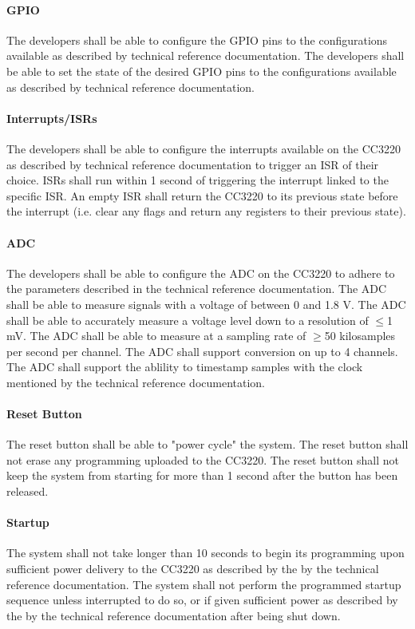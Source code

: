 \paragraph{GPIO} The developers shall be able to configure the GPIO pins to
the configurations available as described by technical reference documentation.
The developers shall be able to set the state of the desired GPIO pins to
the configurations available as described by technical reference documentation.

\paragraph{Interrupts/ISRs} The developers shall be able to configure
the interrupts available on the CC3220 as described by technical reference
documentation to trigger an ISR of their choice. ISRs shall run within 1 second
of triggering the interrupt linked to the specific ISR. An empty ISR shall
return the CC3220 to its previous state before the interrupt (i.e. clear any
flags and return any registers to their previous state).

\paragraph{ADC} The developers shall be able to configure the ADC on the CC3220
to adhere to the parameters described in the technical reference documentation.
The ADC shall be able to measure signals with a voltage of between 0 and 1.8 V.
The ADC shall be able to accurately measure a voltage level down to a
resolution of $\leq$1 mV. The ADC shall be able to measure at a sampling rate
of $\geq$50 kilosamples per second per channel. The ADC shall support
conversion on up to 4 channels. The ADC shall support the ablility to timestamp
samples with the clock mentioned by the technical reference documentation.

\paragraph{Reset Button} The reset button shall be able to "power cycle" the system. The reset button shall not erase
any programming uploaded to the CC3220. The reset button shall not keep the
system from starting for more than 1 second after the button has been released.

\paragraph{Startup} The system shall not take longer than 10 seconds to begin
its programming upon sufficient power delivery to the CC3220 as described by
the by the technical reference documentation. The system shall not perform
the programmed startup sequence unless interrupted to do so, or if given
sufficient power as described by the by the technical reference documentation
after being shut down.

